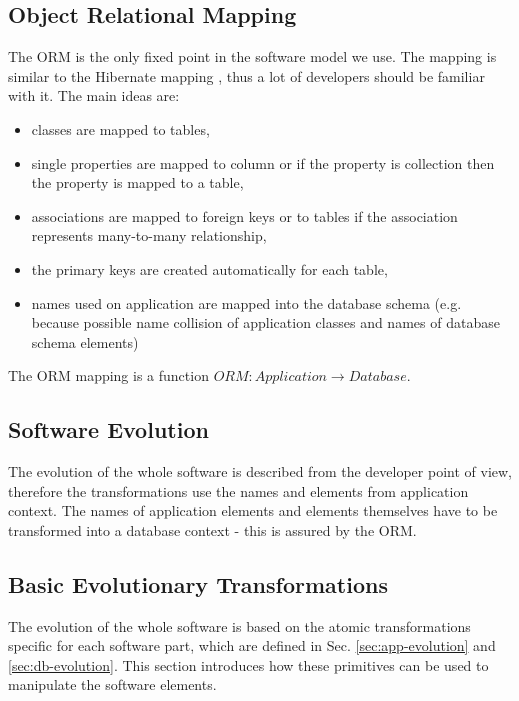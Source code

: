 \documentclass[runningheads]{comsis}
\begin{document}
\subsection{Object Relational Mapping}
The ORM is the only fixed point in the software model we use. The mapping is similar to the Hibernate mapping \cite{Hibernate} , thus a lot of developers should be familiar with it. The main ideas are: 
\begin{itemize}
	\item classes are mapped to tables,
	\item single properties are mapped to column or if the property is collection then the property is mapped to a table,
	\item associations are mapped to foreign keys or to tables if the association represents many-to-many  relationship,
	\item the primary keys are created automatically for each table,
	\item names used on application are mapped into the database schema (e.g. because possible name collision of application classes and names of database schema elements) 
\end{itemize}
The ORM mapping is a function $ORM : Application \rightarrow Database $.

\subsection{Software Evolution}
\label{sec:sw-evolution}
The evolution of the whole software is described from the developer point of view, therefore the transformations use the names and elements from application context. The names of application elements and elements themselves have to be transformed into a database context - this is assured by the ORM.

\subsection{Basic Evolutionary Transformations}
\label{sec:sw-basic-evolution}
The evolution of the whole software is based on the atomic transformations specific for each software part, which are defined in Sec. \ref{sec:app-evolution} and \ref{sec:db-evolution}. This section introduces how these primitives can be used to manipulate the software elements.
\end{document}
